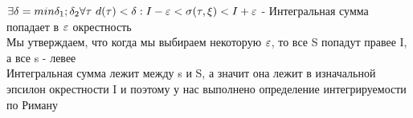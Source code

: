 \begin{Proof}
\begin{center}
\end{center}
$\exists \delta = min{\delta_1; \delta_2}\forall\tau~ d(\tau) < \delta: I - \varepsilon < \sigma(\tau, \xi) < I + \varepsilon$ - Интегральная сумма попадает в $\varepsilon$ окрестность\\
Мы утверждаем, что когда мы выбираем некоторую $\varepsilon$, то все S попадут правее I, а все s - левее\\
Интегральная сумма лежит между s и S, а значит она лежит в изначальной эпсилон окрестности I и поэтому у нас выполнено определение интегрируемости по Риману
\end{Proof}
